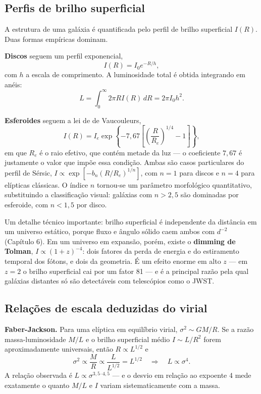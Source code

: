 \documentclass[11pt,a4paper]{article}
\begin{document}
\subsection*{Perfis de brilho superficial}

A estrutura de uma galáxia é quantificada pelo perfil de brilho superficial $I(R)$. Duas formas empíricas dominam.

\textbf{Discos} seguem um perfil exponencial,
\[
I(R)=I_0e^{-R/h},
\]
com $h$ a escala de comprimento. A luminosidade total é obtida integrando em anéis:
\[
L=\int_0^{\infty}2\pi RI(R)\,dR=2\pi I_0h^{2}.
\]

\textbf{Esferoides} seguem a lei de de Vaucouleurs,
\[
I(R)=I_e\exp\left\{-7{,}67\left[\left(\frac{R}{R_e}\right)^{1/4}-1\right]\right\},
\]
em que $R_e$ é o raio efetivo, que contém metade da luz --- o coeficiente $7{,}67$ é justamente o valor que impõe essa condição. Ambas são casos particulares do perfil de Sérsic, $I\propto\exp[-b_n(R/R_e)^{1/n}]$, com $n=1$ para discos e $n=4$ para elípticas clássicas. O índice $n$ tornou-se um parâmetro morfológico quantitativo, substituindo a classificação visual: galáxias com $n>2{,}5$ são dominadas por esferoide, com $n<1{,}5$ por disco.

Um detalhe técnico importante: brilho superficial é independente da distância em um universo estático, porque fluxo e ângulo sólido caem ambos com $d^{-2}$ (Capítulo 6). Em um universo em expansão, porém, existe o \textbf{dimming de Tolman}, $I\propto(1+z)^{-4}$: dois fatores da perda de energia e do estiramento temporal dos fótons, e dois da geometria. É um efeito enorme em alto $z$ --- em $z=2$ o brilho superficial cai por um fator 81 --- e é a principal razão pela qual galáxias distantes só são detectáveis com telescópios como o JWST.

\subsection*{Relações de escala deduzidas do virial}

\textbf{Faber-Jackson.} Para uma elíptica em equilíbrio virial, $\sigma^{2}\sim GM/R$. Se a razão massa-luminosidade $M/L$ e o brilho superficial médio $I\sim L/R^{2}$ forem aproximadamente universais, então $R\propto L^{1/2}$ e
\[
\sigma^{2}\propto\frac{M}{R}\propto\frac{L}{L^{1/2}}=L^{1/2}
\quad\Longrightarrow\quad
L\propto\sigma^{4}.
\]
A relação observada é $L\propto\sigma^{3{,}5\text{--}4{,}5}$ --- e o desvio em relação ao expoente 4 mede exatamente o quanto $M/L$ e $I$ variam sistematicamente com a massa.
\end{document}
